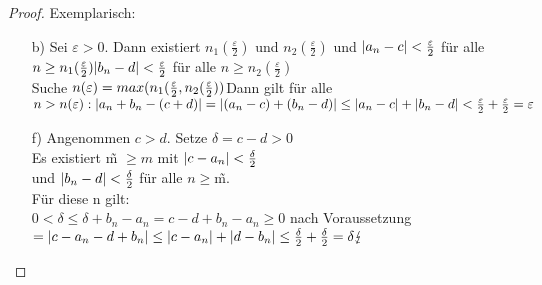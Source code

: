 \begin{proof}
Exemplarisch:
\begin{enumerate}
\item[b)] Sei $\varepsilon > 0$. Dann existiert $n_1(\frac{\varepsilon}{2})$ und $n_2(\frac{\varepsilon}{2})$ und $\lvert a_n -c \rvert < \frac{\varepsilon}{2}$ f\"ur alle $n \geq n_1(\frac{\varepsilon}{2})\\
\lvert b_n-d \rvert < \frac{\varepsilon}{2}$ f\"ur alle $n \geq n_2(\frac{\varepsilon}{2})$\\
Suche $n(\varepsilon) = max (n_1(\frac{\varepsilon}{2},n_2(\frac{\varepsilon}{2}))\\
$Dann gilt f\"ur alle $n > n(\varepsilon):\\
\lvert a_n+b_n - (c+d) \rvert = \lvert (a_n -c) + (b_n -d) \rvert \leq \lvert a_n -c \rvert + \lvert b_n -d \rvert < \frac{\varepsilon}{2} + \frac{\varepsilon}{2} = \varepsilon$
\item[f)]Angenommen $c > d$. Setze $\delta = c -d >0$\\
Es existiert \~m $ \geq m$ mit $\lvert c -a_n \rvert < \frac{\delta}{2}$\\
und $\lvert b_n -d \rvert < \frac{\delta}{2}$ f\"ur alle $n \geq$\~m.\\
F\"ur diese n gilt:\\
$0 < \delta \leq \delta + b_n - a_n = c -d+b_n -a_n \geq 0$ nach Voraussetzung\\
$= \lvert c -a_n - d +b_n \rvert \leq \lvert c-a_n \rvert + \lvert d -b_n \rvert\\
\leq \frac{\delta}{2} + \frac{\delta}{2} = \delta \lightning$
\end{enumerate}
\end{proof}
